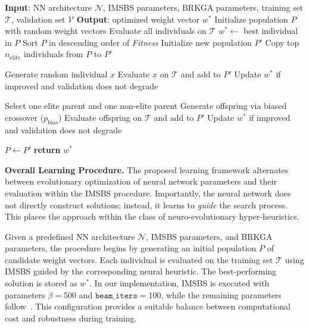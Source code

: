 \documentclass[runningheads]{llncs}
\begin{document}
\begin{algorithm}[!ht]
	\caption{GA-Based Learning of a Beam Search Heuristic} \label{alg:learning_mechanism}
	\begin{algorithmic}[1]
		\STATE \textbf{Input}: NN architecture $\mathcal{N}$, IMSBS parameters, BRKGA parameters, training set $\mathcal{T}$, validation set $\mathcal{V}$
		\STATE \textbf{Output}: optimized weight vector $w^\ast$
		\STATE Initialize population $P$ with random weight vectors
		\STATE Evaluate all individuals on $\mathcal{T}$
		\STATE $w^\ast \leftarrow$ best individual in $P$
		\STATE Sort $P$ in descending order of \emph{Fitness}
		\STATE Initialize new population $P'$
		\STATE Copy top $n_{\text{elite}}$ individuals from $P$ to $P'$
		
		\STATE Generate random individual $x$
		\STATE Evaluate $x$ on $\mathcal{T}$ and add to $P'$
		\STATE Update $w^\ast$ if improved and validation does not degrade
		\ENDFOR
		
		\STATE Select one elite parent and one non-elite parent
		\STATE Generate offspring via biased crossover ($p_{\text{bias}}$)
		\STATE Evaluate offspring on $\mathcal{T}$ and add to $P'$
		\STATE Update $w^\ast$ if improved and validation does not degrade
		\ENDFOR
		
		\STATE $P \leftarrow P'$
		\ENDWHILE
		\STATE \textbf{return} $w^\ast$
	\end{algorithmic}
\end{algorithm}


 
 
 \textbf{Overall Learning Procedure.}
 The proposed learning framework alternates between evolutionary optimization of neural network parameters and their evaluation within the IMSBS procedure. Importantly, the neural network does not directly construct solutions; instead, it learns to \emph{guide} the search process. This places the approach within the class of neuro-evolutionary hyper-heuristics.
 
 Given a predefined NN architecture $\mathcal{N}$, IMSBS parameters, and BRKGA parameters, the procedure begins by generating an initial population $P$ of candidate weight vectors. Each individual is evaluated on the training set $\mathcal{T}$ using IMSBS guided by the corresponding neural heuristic. The best-performing solution is stored as $w^\ast$. In our implementation, IMSBS is executed with parameters $\beta=500$ and $\texttt{beam\_iters}=100$, while the remaining parameters follow~\cite{djukanovic2026_eurocast}. This configuration provides a suitable balance between computational cost and robustness during training.
 
\end{document}
